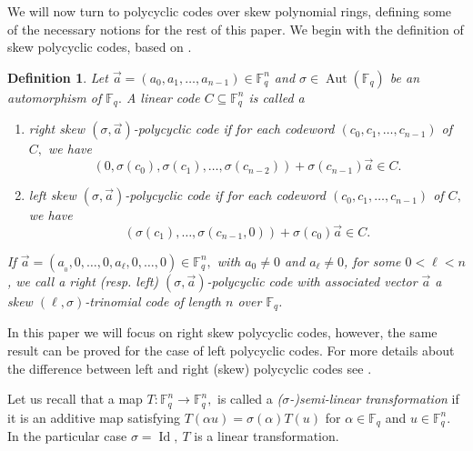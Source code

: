 \documentclass[12pt,paper]{article}
\theoremstyle{plain}
\newtheorem{definition}[theorem]{Definition}
\newcommand{\Fq}{\mathbb{F}_{q}}
\DeclareMathOperator{\aut}{Aut}
\DeclareMathOperator{\id}{Id}
\begin{document}
We will now turn to polycyclic codes over skew polynomial rings, defining some of the necessary notions for the rest of this paper. We begin with the definition of skew polycyclic codes, based on \cite[Definition 8]{Ouazzou2023}.

  \begin{definition}
  Let $ \vec{a}= (a_0,a_1,\ldots, a_{n-1})\in \Fq^n$   and  $\sigma \in \aut(\Fq)$  be an automorphism of $\Fq.$  A linear code $C\subseteq \Fq^n$ is called a
  \begin{enumerate}
      \item  right \emph{skew  $(\sigma,\vec{a})$-polycyclic   code}   if for each codeword  $(c_0,c_1,\ldots, c_{n-1})$ of $C,$  we have 
$$
\left( 0, \sigma(c_0),\sigma(c_1),\ldots, \sigma(c_{n-2})\right) + \sigma(c_{n-1}) \vec{a}  \in C.
$$
\item left \emph{skew  $(\sigma,\vec{a})$-polycyclic   code}   if for each codeword  $(c_0,c_1,\ldots, c_{n-1})$ of $C,$  we have 
$$
\left(\sigma(c_1),\ldots, \sigma(c_{n-1},0)\right) + \sigma(c_{0}) \vec{a}  \in C.
$$
 \end{enumerate}
    If $\vec{a}=\left(a_{_0},0,\ldots, 0,a_{\ell}, 0, \ldots, 0\right)\in \Fq^{n},$ with $a_0\neq 0 $ and $ a_{\ell}\neq 0$, for some $ 0<\ell <n $, we call a right (resp. left)    $(\sigma,\vec{a})$-polycyclic code with  associated vector $\vec{a}$  a \emph{skew $(\ell,\sigma)$-trinomial code}  of length $n$ over $\Fq$.
 \end{definition}
 In this paper we will focus on right skew polycyclic codes, however, the same result can be proved for the case of left polycyclic codes. For more details about the difference between left and right (skew) polycyclic codes see \cite{Lopez2009,Poly,ou2024linear,Ouazzou2023, Hassan2025Advances}.
 
 Let us recall that a map $T: \Fq^n \to \Fq^n,$ is called a \emph{($\sigma$-)semi-linear transformation} if it is an additive map satisfying $ T(\alpha u)=\sigma( \alpha ) T(u)$ for $\alpha \in \Fq$ and $u\in \Fq^n$. In the particular case $\sigma=\id, \ T$ is a linear transformation. 
 
\end{document}
